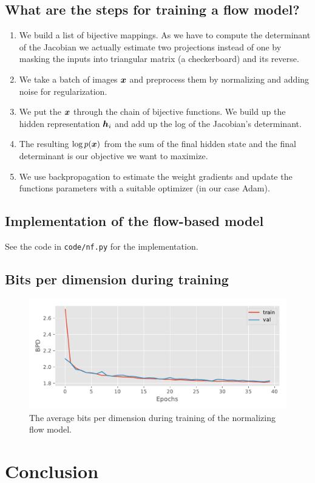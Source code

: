 \documentclass{article}
\begin{document}
\subsection{What are the steps for training a flow model?}
\begin{enumerate}
  \item We build a list of bijective mappings. As we have to compute the determinant of the Jacobian we actually estimate two projections instead of one by masking the inputs into triangular matrix (a checkerboard) and its reverse.
  \item We take a batch of images \(\B{x}\) and preprocess them by normalizing and adding noise for regularization.
  \item We put the \(\B{x}\) through the chain of bijective functions. We build up the hidden representation \(\B{h}_i\) and add up the log of the Jacobian's determinant.
  \item The resulting \(\log p(\B{x})\) from the sum of the final hidden state and the final determinant is our objective we want to maximize.
  \item We use backpropagation to estimate the weight gradients and update the functions parameters with a suitable optimizer (in our case Adam).
\end{enumerate}

\subsection{Implementation of the flow-based model}
See the code in \texttt{code/nf.py} for the implementation.

\subsection{Bits per dimension during training}
\begin{figure}
  \centering
  \includegraphics[width=0.7\linewidth]{assignment_3/code/figures/nf.pdf}
  \caption{The average bits per dimension during training of the normalizing flow model.}
  \label{fig:nf}
\end{figure}

\section{Conclusion}



\end{document}
